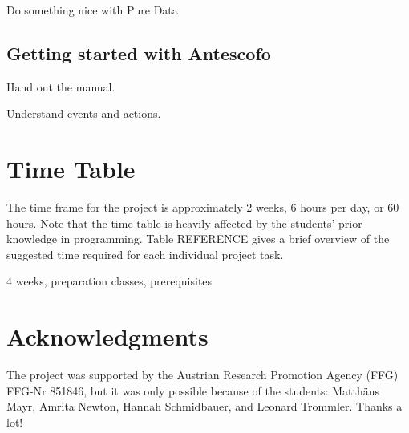 \documentclass[onecolumn,nocopyrightspace,preprint]{sigplanconf}
\begin{document}
Do something nice with Pure Data


\subsection{Getting started with Antescofo}


Hand out the manual.

Understand events and actions.





\section{Time Table}

The time frame for the project is approximately 2 weeks, 6 hours per day, or
60 hours. Note that the time table is heavily affected by the students' prior
knowledge in programming. Table REFERENCE gives a brief overview of the
suggested time required for each individual project task.






4 weeks, preparation classes, prerequisites




\section{Acknowledgments}

The project was supported by the Austrian Research Promotion Agency (FFG) FFG-Nr 851846, but it
was only possible because of the students: Matthäus Mayr, Amrita Newton, Hannah Schmidbauer, and
Leonard Trommler. Thanks a lot!


 
\end{document}
